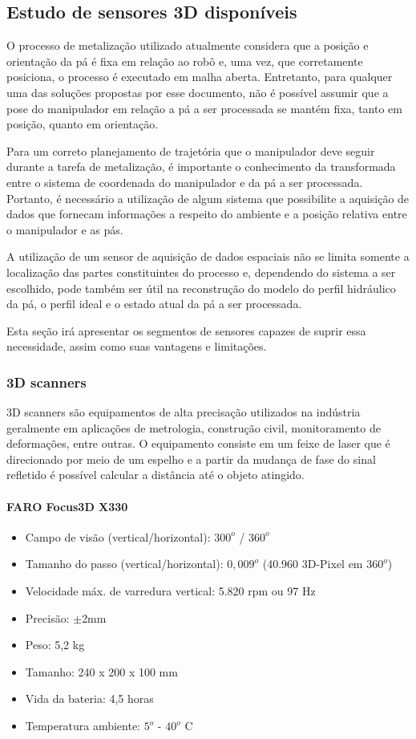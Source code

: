 \subsection{Estudo de sensores 3D disponíveis}

O processo de metalização utilizado atualmente considera que a posição e
orientação da pá é fixa em relação ao robô e, uma vez, que corretamente
posiciona, o processo é executado em malha aberta. Entretanto, para qualquer uma
das soluções propostas por esse documento, não é possível assumir que a pose
do manipulador em relação a pá a ser processada se mantém fixa, tanto em posição,
 quanto em orientação.

Para um correto planejamento de trajetória que o manipulador deve seguir durante
a tarefa de metalização, é importante o conhecimento da transformada entre o
sistema de coordenada do manipulador e da pá a ser processada. Portanto, é
necessário a utilização de algum sistema que possibilite a aquisição de dados
que fornecam informações a respeito do ambiente e a posição relativa entre o
manipulador e as pás.

A utilização de um sensor de aquisição de dados espaciais não se limita somente
a localização das partes constituintes do processo e, dependendo do sistema a
ser escolhido, pode também ser útil na reconstrução do modelo do perfil
hidráulico da pá, o perfil ideal e o estado atual da pá a ser processada.

Esta seção irá apresentar os segmentos de sensores capazes de suprir essa
necessidade, assim como suas vantagens e limitações. 


\subsubsection{3D scanners}

3D scanners são equipamentos de alta precisação utilizados na indústria
geralmente em aplicações de metrologia, construção civil, monitoramento de
deformações, entre outras. O equipamento consiste em um feixe de laser que é
direcionado por meio de um espelho e a partir da mudança de fase do sinal
refletido é possível calcular a distância até o objeto atingido.

\paragraph{FARO Focus3D X330}

\begin{itemize}
  \item Campo de visão (vertical/horizontal): $300^o$ / $360^o$
  \item Tamanho do passo (vertical/horizontal): $0,009^o$ (40.960 3D-Pixel em
  $360^o$)
  \item Velocidade máx. de varredura vertical: 5.820 rpm ou 97 Hz
  \item Precisão: $\pm$2mm
  \item Peso: 5,2 kg
  \item Tamanho: 240 x 200 x 100 mm
  \item Vida da bateria: 4,5 horas
  \item Temperatura ambiente: $5^o$ - $40^o$ C
\end{itemize}

